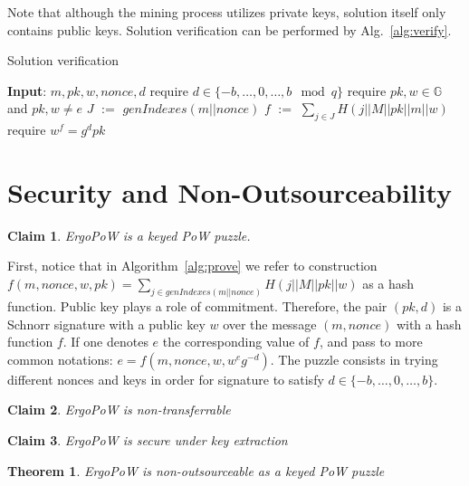 \documentclass[]{article}
\def\Let#1#2{\State #1 $:=$ #2}
\newtheorem{theorem}{Theorem}
\newtheorem{claim}{Claim}
\begin{document}
    Note that although the mining process utilizes private keys, solution itself
    only contains public keys. Solution verification can be performed by Alg.~\ref{alg:verify}.

    \begin{algorithm}[H]
        \caption{Solution verification}
        \label{alg:verify}
        \begin{algorithmic}[1]
            \State \textbf{Input}: $m,pk,w,nonce,d$
            \State require $d\in\{-b,\dots,0,\dots, b\mod q\}$
            \State require $pk,w\in \mathbb{G}$ and $pk,w \ne e$
            \Let{$J$}{$genIndexes(m||nonce)$}
            \Let{$f$}{$\sum_{j \in J} H(j||M||pk||m||w)$}
            \State require $w^f = g^dpk$
        \end{algorithmic}
    \end{algorithm}

    \section{Security and Non-Outsourceability}
    \begin{claim}
        ErgoPoW is a keyed PoW puzzle.
    \end{claim}
    First, notice that in Algorithm~\ref{alg:prove} we refer to construction
    $f(m,nonce,w,pk)=\sum_{j\in genIndexes(m||nonce)} H(j||M||pk||w)$ as a hash
    function. Public key plays a role of commitment. Therefore, the pair
    $(pk,d)$ is a Schnorr signature with a public key $w$ over the message
    $(m,nonce)$ with a hash function $f$. If one denotes $e$ the corresponding
    value of $f$, and pass to more common notations:
    $e=f(m,nonce,w,w^eg^{-d})$. The puzzle consists in trying
    different nonces and keys in order for signature to satisfy
    $d\in\{-b,\dots,0,\dots,b\}$. 
    \begin{claim}
        ErgoPoW is non-transferrable
    \end{claim}
    
    \begin{claim}
        ErgoPoW is secure under key extraction
    \end{claim}
    \begin{theorem}
        ErgoPoW is non-outsourceable as a keyed PoW puzzle
    \end{theorem}
\end{document}
